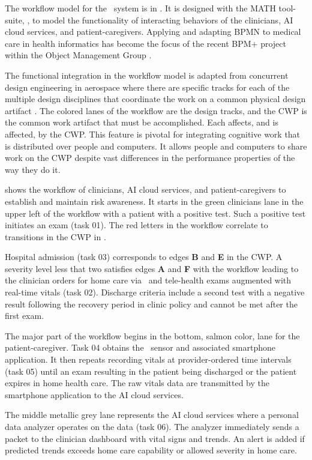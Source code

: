The workflow model for the \phware\ system is in . It is designed with the MATH tool-suite, \cite{workflowmodel}, to model the functionality of interacting behaviors of the clinicians, AI cloud services, and patient-caregivers. Applying and adapting BPMN to medical care in health informatics has become the focus of the recent BPM+ project within the Object Management Group \cite{bpm}. 

The functional integration in the workflow model is adapted from concurrent design engineering in aerospace where there are specific tracks for each of the multiple design disciplines that coordinate the work on a common physical design artifact \cite{10.1007/978-1-4471-1538-0_9}. The colored lanes of the workflow are the design tracks, and the CWP is the common work artifact that must be accomplished. Each affects, and is affected, by the CWP. This feature is pivotal for integrating cognitive work that is distributed over people and computers. It allows people and computers to share work on the CWP despite vast differences in the performance properties of the way they do it. 

 shows the workflow of clinicians, AI cloud services, and patient-caregivers to establish and maintain risk awareness. It starts in the green clinicians lane in the upper left of the workflow with a patient with a positive test. Such a positive test initiates an exam (task 01). The red letters in the workflow correlate to transitions in the CWP in . 

Hospital admission (task 03) corresponds to edges \textbf{B} and \textbf{E} in the CWP. A severity level less that two satisfies edges \textbf{A} and \textbf{F} with the workflow leading to the clinician orders for home care via \phware\ and tele-health exams augmented with real-time vitals (task 02). Discharge criteria include a second test with a negative result following the recovery period in clinic policy and cannot be met after the first exam.

The major part of the workflow begins in the bottom, salmon color, lane for the patient-caregiver. Task 04 obtains the \phware\ sensor and associated smartphone application. It then repeats recording vitals at provider-ordered time intervals (task 05) until an exam resulting in the patient being discharged or the patient expires in home health care. The raw vitals data are transmitted by the smartphone application to the AI cloud services. 

The middle metallic grey lane represents the AI cloud services where a personal data analyzer operates on the data (task 06).  The analyzer immediately sends a packet to the clinician dashboard with vital signs and trends. An alert is added if predicted trends exceeds home care capability or allowed severity in home care.

